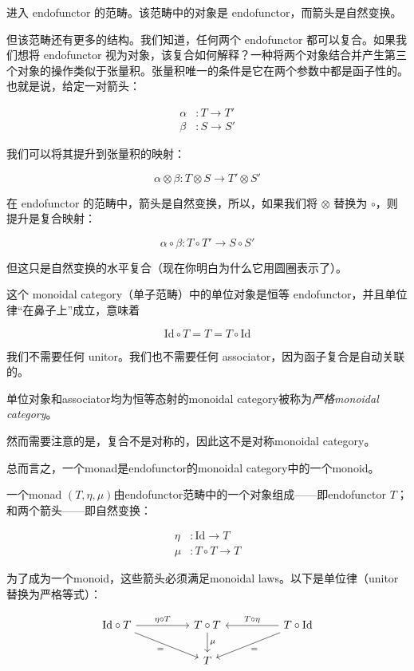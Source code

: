 \documentclass[DaoFP]{subfiles}
\begin{document}
    进入 endofunctor 的范畴。该范畴中的对象是 endofunctor，而箭头是自然变换。

    但该范畴还有更多的结构。我们知道，任何两个 endofunctor 都可以复合。如果我们想将 endofunctor 视为对象，该复合如何解释？一种将两个对象结合并产生第三个对象的操作类似于张量积。张量积唯一的条件是它在两个参数中都是函子性的。也就是说，给定一对箭头：

    \begin{align*}
        \alpha &\colon T \to T' \\
        \beta &\colon S \to S'
    \end{align*}

    我们可以将其提升到张量积的映射：

    \[ \alpha \otimes \beta \colon T \otimes S \to T' \otimes S' \]

    在 endofunctor 的范畴中，箭头是自然变换，所以，如果我们将 $\otimes$ 替换为 $\circ$，则提升是复合映射：

    \[ \alpha \circ \beta \colon T \circ T' \to S \circ S' \]

    但这只是自然变换的水平复合（现在你明白为什么它用圆圈表示了）。

    这个 monoidal category（单子范畴）中的单位对象是恒等 endofunctor，并且单位律“在鼻子上”成立，意味着

    \[ \text{Id} \circ T = T = T \circ \text{Id} \]

    我们不需要任何 unitor。我们也不需要任何 associator，因为函子复合是自动关联的。

    单位对象和associator均为恒等态射的monoidal category被称为\emph{严格monoidal category}。

    然而需要注意的是，复合不是对称的，因此这不是对称monoidal category。

    总而言之，一个monad是endofunctor的monoidal category中的一个monoid。

    一个monad $(T, \eta, \mu)$由endofunctor范畴中的一个对象组成——即endofunctor $T$；和两个箭头——即自然变换：

    \begin{align*}
        \eta &\colon \text{Id} \to T \\
        \mu &\colon T \circ T \to T
    \end{align*}

    为了成为一个monoid，这些箭头必须满足monoidal laws。以下是单位律（unitor替换为严格等式）：

    \[
        \begin{tikzcd}
            \text{Id} \circ T
            \arrow[rr, "\eta \circ T"]
            \arrow[rrd, "="']
            & & T \circ T
            \arrow[d, "\mu"]
            && T \circ \text{Id}
            \arrow[ll, "T \circ \eta"']
            \arrow[lld, "="]
            \\
            && T
        \end{tikzcd}
    \]
\end{document}
